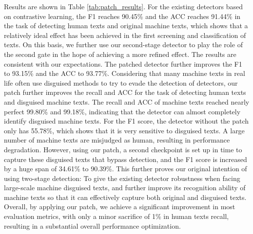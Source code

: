 \documentclass[11pt]{article}
\begin{document}
				Results are shown in Table \ref{tab:patch_results}. For the existing detectors based on contrastive learning, the F1 reaches 90.45\% and the ACC reaches 91.44\% in the task of detecting human texts and original machine texts, which shows that a relatively ideal effect has been achieved in the first screening and classification of texts. On this basis, we further use our second-stage detector to play the role of the second gate in the hope of achieving a more refined effect. The results are consistent with our expectations. The patched detector further improves the F1 to 93.15\% and the ACC to 93.77\%. Considering that many machine texts in real life often use disguised methods to try to evade the detection of detectors, our patch further improves the recall and ACC for the task of detecting human texts and disguised machine texts. The recall and ACC of machine texts reached nearly perfect 99.80\% and 99.18\%, indicating that the detector can almost completely identify disguised machine texts. For the F1 score, the detector without the patch only has 55.78\%, which shows that it is very sensitive to disguised texts. A large number of machine texts are misjudged as human, resulting in performance degradation. However, using our patch, a second checkpoint is set up in time to capture these disguised texts that bypass detection, and the F1 score is increased by a huge span of 34.61\% to 90.39\%. This further proves our original intention of using two-stage detection: To give the existing detector robustness when facing large-scale machine disguised texts, and further improve its recognition ability of machine texts so that it can effectively capture both original and disguised texts. Overall, by applying our patch, we achieve a significant improvement in most evaluation metrics, with only a minor sacrifice of 1\% in human texts recall, resulting in a substantial overall performance optimization.
	
\end{document}
